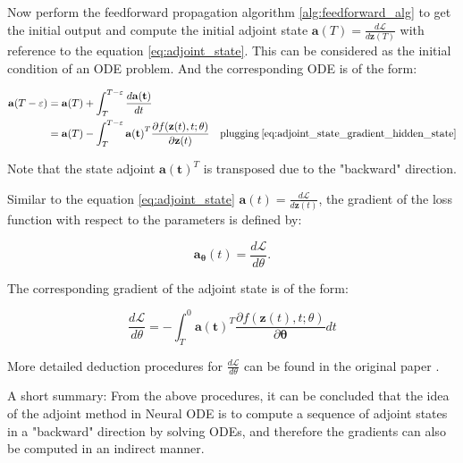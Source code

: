 \documentclass[
	parskip, 			   %
	twoside, 			   %
	DIV=14, 			   %
	BCOR=15.0mm, 		   %
	headsepline, 		   %
	open=right, 		   %
	captions=tableheading, %
	bibliography=totoc,    %
	numbers=noenddot       %
]{scrreprt}
\begin{document}
Now perform the feedforward propagation algorithm \ref{alg:feedforward_alg}  to get the initial output and compute the initial adjoint state $\mathbf{a}(T) = \frac{d\mathcal{L}}{d\mathbf{z}(T)}$ with reference to the equation \ref{eq:adjoint_state}. This can be considered as the initial condition of an ODE problem. And the corresponding ODE is of the form:

\begin{equation}
    \label{eq:adjoint_state_ODE}
    \begin{aligned}
    \mathbf{a}(T-\varepsilon) &= \mathbf{a}(T) + \int_{T}^{T-\varepsilon} \frac{d\mathbf{a(t)}}{dt} \\
    &= \mathbf{a}(T) - \int_{T}^{T-\varepsilon} \mathbf{a(t)}^T \frac{\partial f(\mathbf{z}(t), t; \theta)}{\partial \mathbf{z}(t)} \quad \text{plugging} \: \ref{eq:adjoint_state_gradient_hidden_state} \\ 
    \end{aligned}
\end{equation}

Note that the state adjoint $\mathbf{a(t)}^T$ is transposed due to the "backward" direction.

Similar to the equation \ref{eq:adjoint_state} $\mathbf{a}(t) = \frac{d\mathcal{L}}{d\mathbf{z}(t)}$, the gradient of the loss function with respect to the parameters is defined by:

\begin{equation}
    \label{eq:adjoint_state_parameters}
    \mathbf{a_\theta}(t) = \frac{d\mathcal{L}}{d\theta}.
\end{equation}

The corresponding gradient of the adjoint state is of the form:

\begin{equation}
    \label{eq:adjoint_state_gradient_parameters}
    \frac{d\mathcal{L}}{d\theta} = - \int_{T}^{0} \mathbf{a(t)}^T \frac{\partial f(\mathbf{z}(t), t; \theta)}{\partial \mathbf{\theta}} dt
\end{equation}


More detailed deduction procedures for $\frac{d\mathcal{L}}{d\theta}$ can be found in the original paper \cite{chen2018neural}.

A short summary: From the above procedures, it can be concluded that the idea of the adjoint method in Neural ODE is to compute a sequence of adjoint states in a "backward" direction by solving ODEs, and therefore the gradients can also be computed in an indirect manner.
\end{document}
